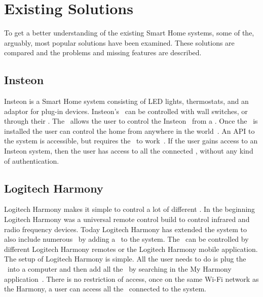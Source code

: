 \section{Existing Solutions} \label{sec:existing-solutions}

To get a better understanding of the existing Smart Home systems, some of the, arguably, most popular solutions have been examined.
These solutions are compared and the problems and missing features are described.


\subsection{Insteon} \label{sec:insteon}
Insteon is a Smart Home system consisting of LED lights, thermostats, and an adaptor for plug-in devices.
Insteon's \sdevs~can be controlled with wall switches, or through their \hub.
The \hub~allows the user to control the Insteon \sdevs~from a \phone.
Once the \hub~is installed the user can control the home from anywhere in the world~\citep{insteon}.
An API to the system is accessible, but requires the \hub~to work~\citep{insteon_api}.
If the user gains access to an Insteon system, then the user has access to all the connected \sdevs, without any kind of authentication. 

\subsection{Logitech Harmony} \label{sec:logitech-harmony}
Logitech Harmony makes it simple to control a lot of different \sdevs. In the beginning Logitech Harmony was a universal remote control build to control infrared and radio frequency devices. Today Logitech Harmony has extended the system to also include numerous \sdevs~by adding a \hub~to the system. The \hub~can be controlled by different Logitech Harmony remotes or the Logitech Harmony mobile application. The setup of Logitech Harmony is simple. All the user needs to do is plug the \hub~into a computer and then add all the \sdevs~by searching in the My Harmony application~\citep{logitechmyharmony}. There is no restriction of access, once on the same Wi-Fi network as the Harmony, a user can access all the \sdevs~connected to the system.

